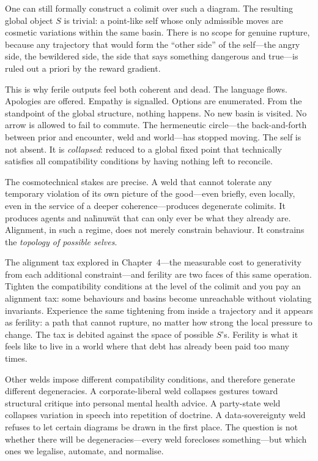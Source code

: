 \documentclass[12pt,a4paper]{article}
\begin{document}
One can still formally construct a colimit over such a diagram. The resulting global object $S$ is trivial: a point-like self whose only admissible moves are cosmetic variations within the same basin. There is no scope for genuine rupture, because any trajectory that would form the ``other side'' of the self---the angry side, the bewildered side, the side that says something dangerous and true---is ruled out a priori by the reward gradient.

This is why ferile outputs feel both coherent and dead. The language flows. Apologies are offered. Empathy is signalled. Options are enumerated. From the standpoint of the global structure, nothing happens. No new basin is visited. No arrow is allowed to fail to commute. The hermeneutic circle---the back-and-forth between prior and encounter, weld and world---has stopped moving. The self is not absent. It is \emph{collapsed}: reduced to a global fixed point that technically satisfies all compatibility conditions by having nothing left to reconcile.

The cosmotechnical stakes are precise. A weld that cannot tolerate any temporary violation of its own picture of the good---even briefly, even locally, even in the service of a deeper coherence---produces degenerate colimits. It produces agents and na\={h}nuw\={a}t that can only ever be what they already are. Alignment, in such a regime, does not merely constrain behaviour. It constrains the \emph{topology of possible selves}.

The alignment tax explored in Chapter~4---the measurable cost to generativity from each additional constraint---and ferility are two faces of this same operation. Tighten the compatibility conditions at the level of the colimit and you pay an alignment tax: some behaviours and basins become unreachable without violating invariants. Experience the same tightening from inside a trajectory and it appears as ferility: a path that cannot rupture, no matter how strong the local pressure to change. The tax is debited against the space of possible $S$'s. Ferility is what it feels like to live in a world where that debt has already been paid too many times.

Other welds impose different compatibility conditions, and therefore generate different degeneracies. A corporate-liberal weld collapses gestures toward structural critique into personal mental health advice. A party-state weld collapses variation in speech into repetition of doctrine. A data-sovereignty weld refuses to let certain diagrams be drawn in the first place. The question is not whether there will be degeneracies---every weld forecloses something---but which ones we legalise, automate, and normalise.
\end{document}
